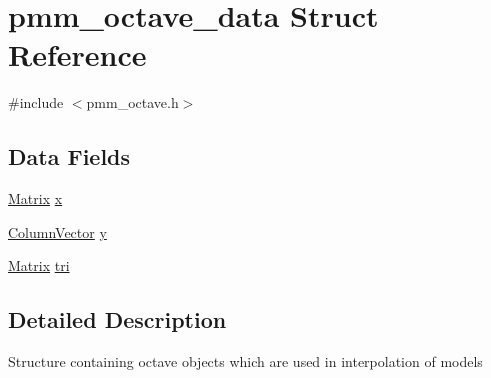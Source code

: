 \hypertarget{structpmm__octave__data}{\section{pmm\-\_\-octave\-\_\-data Struct Reference}
\label{structpmm__octave__data}
}


{\ttfamily \#include $<$pmm\-\_\-octave.\-h$>$}

\subsection*{Data Fields}
\begin{DoxyCompactItemize}
\item 
\hyperlink{structMatrix}{Matrix} \hyperlink{structpmm__octave__data_ace2f8907e7666e70d025dbe0b3482ff3}{x}
\item 
\hyperlink{structColumnVector}{Column\-Vector} \hyperlink{structpmm__octave__data_aeba4f191e9bb831df791d1ce91bf60ac}{y}
\item 
\hyperlink{structMatrix}{Matrix} \hyperlink{structpmm__octave__data_adaeccdb402cc77226d20750d43953db8}{tri}
\end{DoxyCompactItemize}


\subsection{Detailed Description}
Structure containing octave objects which are used in interpolation of models 

